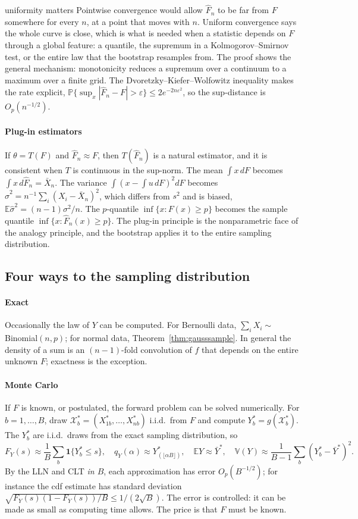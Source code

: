 \documentclass[11pt,a4paper]{article}
\newcommand{\E}{\mathbb{E}}
\newcommand{\V}{\mathbb{V}}
\renewcommand{\P}{\mathbb{P}}
\newcommand{\Op}{O_p}
\newcommand{\iid}{i.i.d.}
\newcommand{\one}{\mathbf 1}
\newcommand{\Xbar}{\bar X_n}
\newcommand{\Fn}{\widehat F_n}
\begin{document}
\begin{whybox}{uniformity matters}
Pointwise convergence would allow $\Fn$ to be far from $F$ somewhere for every $n$, at a point that moves with $n$. Uniform convergence says the whole curve is close, which is what is needed when a statistic depends on $F$ through a global feature: a quantile, the supremum in a Kolmogorov--Smirnov test, or the entire law that the bootstrap resamples from. The proof shows the general mechanism: monotonicity reduces a supremum over a continuum to a maximum over a finite grid. The Dvoretzky--Kiefer--Wolfowitz inequality makes the rate explicit, $\P\{\sup_x|\Fn-F|>\varepsilon\}\le2e^{-2n\varepsilon^2}$, so the sup-distance is $\Op(n^{-1/2})$.
\end{whybox}

\paragraph{Plug-in estimators}
If $\theta=T(F)$ and $\Fn\approx F$, then $T(\Fn)$ is a natural estimator, and it is consistent when $T$ is continuous in the sup-norm. The mean $\int x\,dF$ becomes $\int x\,d\Fn=\Xbar$. The variance $\int(x-\int u\,dF)^2dF$ becomes $\hat\sigma^2=n^{-1}\sum_i(X_i-\Xbar)^2$, which differs from $s^2$ and is biased, $\E\hat\sigma^2=(n-1)\sigma^2/n$. The $p$-quantile $\inf\{x:F(x)\ge p\}$ becomes the sample quantile $\inf\{x:\Fn(x)\ge p\}$. The plug-in principle is the nonparametric face of the analogy principle, and the bootstrap applies it to the entire sampling distribution.

\subsection{Four ways to the sampling distribution}

\paragraph{Exact}\label{sec:exact}
Occasionally the law of $Y$ can be computed. For Bernoulli data, $\sum_iX_i\sim$ Binomial$(n,p)$; for normal data, Theorem~\ref{thm:gausssample}. In general the density of a sum is an $(n-1)$-fold convolution of $f$ that depends on the entire unknown $F$; exactness is the exception.

\paragraph{Monte Carlo}\label{sec:mc}
If $F$ is known, or postulated, the forward problem can be solved numerically. For $b=1,\ldots,B$, draw $\mathcal X_b^*=(X_{1b}^*,\ldots,X_{nb}^*)$ \iid\ from $F$ and compute $Y_b^*=g(\mathcal X_b^*)$. The $Y_b^*$ are \iid\ draws from the exact sampling distribution, so
\[
F_Y(s)\approx\frac1B\sum_b\one\{Y_b^*\le s\},\quad q_Y(\alpha)\approx Y^*_{(\lfloor\alpha B\rfloor)},\quad\E Y\approx\bar Y^*,\quad\V(Y)\approx\frac{1}{B-1}\sum_b(Y_b^*-\bar Y^*)^2 .
\]
By the LLN and CLT \emph{in $B$}, each approximation has error $\Op(B^{-1/2})$; for instance the cdf estimate has standard deviation $\sqrt{F_Y(s)(1-F_Y(s))/B}\le1/(2\sqrt B)$. The error is controlled: it can be made as small as computing time allows. The price is that $F$ must be known.
\end{document}

